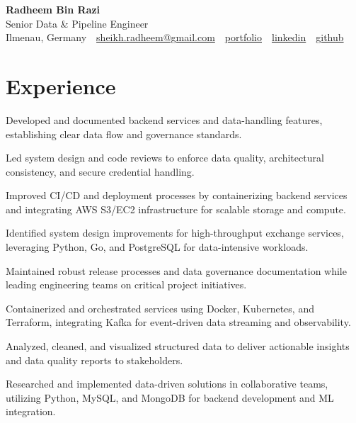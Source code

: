 \documentclass[11pt,a4paper]{resume}
\makeatletter
\newcommand{\Portfolio}{https://radheem.github.io/my-cv}
\newcommand{\PortfolioText}{portfolio}
\newcommand{\GitHub}{https://github.com/radheem}
\newcommand{\LinkedIn}{https://www.linkedin.com/in/radheem-razi}
\newcommand{\Email}{sheikh.radheem@gmail.com}
\makeatother
\begin{document}
\begin{center}
  {\huge\bfseries Radheem Bin Razi}\\[3pt]
  {\large Senior Data \& Pipeline Engineer}\\[6pt]
  \small
  Ilmenau, Germany \,\textbar\,
  \href{mailto:\Email}{\Email} \,\textbar\,
  \href{\Portfolio}{\PortfolioText} \,\textbar\,
  \href{\LinkedIn}{linkedin} \,\textbar\,
  \href{\GitHub}{github}
\end{center}
\vspace{2pt}

\section{Experience}

\bullets
  \item Developed and documented backend services and data-handling features, establishing clear data flow and governance standards.
  \item Led system design and code reviews to enforce data quality, architectural consistency, and secure credential handling.
  \item Improved CI/CD and deployment processes by containerizing backend services and integrating AWS S3/EC2 infrastructure for scalable storage and compute.
\bulletsend
\vspace{3pt}
\bullets
  \item Identified system design improvements for high-throughput exchange services, leveraging Python, Go, and PostgreSQL for data-intensive workloads.
  \item Maintained robust release processes and data governance documentation while leading engineering teams on critical project initiatives.
  \item Containerized and orchestrated services using Docker, Kubernetes, and Terraform, integrating Kafka for event-driven data streaming and observability.
\bulletsend
\vspace{3pt}
\bullets
  \item Analyzed, cleaned, and visualized structured data to deliver actionable insights and data quality reports to stakeholders.
  \item Researched and implemented data-driven solutions in collaborative teams, utilizing Python, MySQL, and MongoDB for backend development and ML integration.
\bulletsend
\vspace{3pt}
\end{document}
